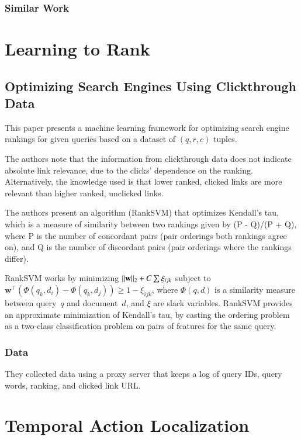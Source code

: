 \documentclass[a4paper, 12pt]{article}
\DeclarePairedDelimiter\norm{\lVert}{\rVert}%
\begin{document}
\subsubsection{Similar Work}


\section{Learning to Rank}


\subsection{Optimizing Search Engines Using Clickthrough
            Data~\cite{joachims-optimizing-2002}}

This paper presents a machine learning framework for optimizing search engine
rankings for given queries based on a dataset of $(q, r, c)$ tuples.

The authors note that the information from clickthrough data does not indicate
absolute link relevance, due to the clicks' dependence on the ranking.
Alternatively, the knowledge used is that lower ranked, clicked links are more
relevant than higher ranked, unclicked links.

The authors present an algorithm (RankSVM) that optimizes Kendall's tau, which
is a measure of similarity between two rankings given by (P - Q)/(P + Q), where
P is the number of concordant pairs (pair orderings both rankings agree on),
and Q is the number of discordant pairs (pair orderings where the rankings
differ).

RankSVM works by minimizing $\norm{\mathbf{w}}_2 + C\sum \xi_{ijk}$ subject to
$\mathbf{w}^\intercal (\Phi(q_k, d_i) - \Phi(q_k, d_j)) \geq 1 - \xi_{ijk}$,
where $\Phi(q, d)$ is a similarity measure between query~$q$ and document~$d$,
and $\xi$ are slack variables. RankSVM provides an approximate minimization of
Kendall's tau, by casting the ordering problem as a two-class classification
problem on pairs of features for the same query.


\subsubsection{Data}

They collected data using a proxy server that keeps a log of query IDs, query
words, ranking, and clicked link URL.


\section{Temporal Action Localization}
\end{document}
